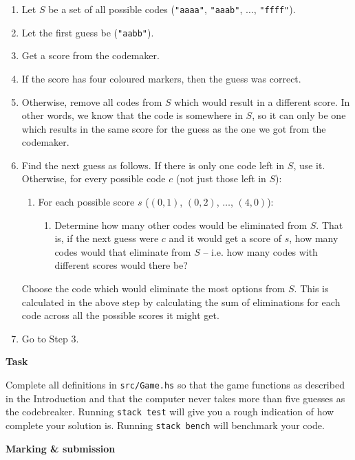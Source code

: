\documentclass{cs256-shared/cs256}
\begin{document}
\begin{enumerate}
\item Let $S$ be a set of all possible codes (\texttt{"aaaa"}, \texttt{"aaab"}, $\ldots$, \texttt{"ffff"}).
\item Let the first guess be (\texttt{"aabb"}).
\item Get a score from the codemaker.
\item If the score has four coloured markers, then the guess was correct.
\item Otherwise, remove all codes from $S$ which would result in a different score. In other words, we know that the code is somewhere in $S$, so it can only be one which results in the same score for the guess as the one we got from the codemaker. 
\item Find the next guess as follows. If there is only one code left in $S$, use it. Otherwise, for every possible code $c$ (not just those left in $S$):
\begin{enumerate}
    \item For each possible score $s$ ($(0,1)$, $(0,2)$, $\ldots$, $(4,0)$):
    \begin{enumerate}
        \item Determine how many other codes would be eliminated from $S$. That is, if the next guess were $c$ and it would get a score of $s$, how many codes would that eliminate from $S$ -- i.e. how many codes with different scores would there be?
    \end{enumerate}
\end{enumerate}
Choose the code which would eliminate the most options from $S$. This is calculated in the above step by calculating the sum of eliminations for each code across all the possible scores it might get.
\item Go to Step 3.
\end{enumerate}

\textbf{Task}

Complete all definitions in \texttt{src/Game.hs} so that the game functions as described in the Introduction and that the computer never takes more than five guesses as the codebreaker. Running \texttt{stack test} will give you a rough indication of how complete your solution is. Running \texttt{stack bench} will benchmark your code.

\pagebreak

\textbf{Marking \& submission}
\end{document}
